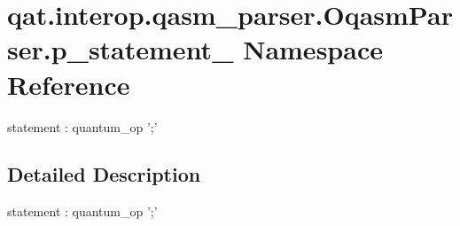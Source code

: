 \hypertarget{namespaceqat_1_1interop_1_1qasm__parser_1_1OqasmParser_1_1p__statement__0}{\section{qat.\-interop.\-qasm\-\_\-parser.\-Oqasm\-Parser.\-p\-\_\-statement\-\_ Namespace Reference}
\label{namespaceqat_1_1interop_1_1qasm__parser_1_1OqasmParser_1_1p__statement__0}
}


statement \-: quantum\-\_\-op ';'  




\subsection{Detailed Description}
statement \-: quantum\-\_\-op ';' 